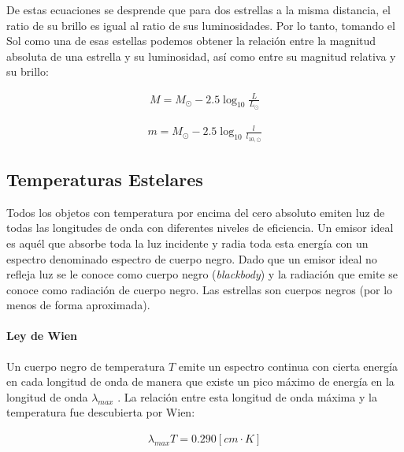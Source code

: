 \documentclass{tufte-handout}
\begin{document}
De estas ecuaciones se desprende que para dos estrellas a la misma distancia, el ratio de su brillo es igual al ratio de sus luminosidades. Por lo tanto, tomando el Sol como una de esas estellas podemos obtener la relación entre la magnitud absoluta de una estrella y su luminosidad, así como entre su magnitud relativa y su brillo:

\begin{align}
  M = M_{\odot} - 2.5 \log_{10}\frac{L}{L_{\odot}}
\end{align}

\begin{align}
  m = M_{\odot} - 2.5 \log_{10}\frac{l}{l_{10, \odot}}
\end{align}

\subsection{Temperaturas Estelares}

Todos los objetos con temperatura por encima del cero absoluto emiten luz de todas las longitudes de onda con diferentes niveles de eficiencia. Un emisor ideal es aquél que absorbe toda la luz incidente y radia toda esta energía con un espectro denominado espectro de cuerpo negro. Dado que un emisor ideal no refleja luz se le conoce como cuerpo negro (\emph{blackbody}) y la radiación que emite se conoce como radiación de cuerpo negro. Las estrellas son cuerpos negros (por lo menos de forma aproximada).

\paragraph{Ley de Wien}

Un cuerpo negro de temperatura $T$ emite un espectro continua con cierta energía en cada longitud de onda de manera que existe un pico máximo de energía en la longitud de onda $\lambda_{max}$ . La relación entre esta longitud de onda máxima y la temperatura fue descubierta por Wien:

\begin{align}
  \lambda_{max} T = 0.290 [cm \cdot K]
\end{align}

\end{document}
